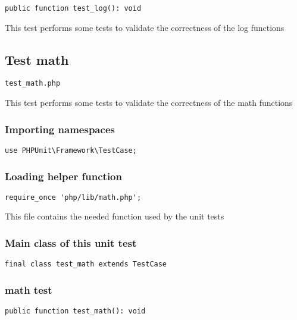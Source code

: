 \documentclass[a4paper]{article}
\begin{document}
\begin{lstlisting}
public function test_log(): void
\end{lstlisting}

This test performs some tests to validate the correctness
of the log functions

\hypertarget{toc258}{}
\subsection{Test math}

\begin{lstlisting}
test_math.php
\end{lstlisting}

This test performs some tests to validate the correctness
of the math functions

\hypertarget{toc259}{}
\subsubsection{Importing namespaces}

\begin{lstlisting}
use PHPUnit\Framework\TestCase;
\end{lstlisting}

\hypertarget{toc260}{}
\subsubsection{Loading helper function}

\begin{lstlisting}
require_once 'php/lib/math.php';
\end{lstlisting}

This file contains the needed function used by the unit tests

\hypertarget{toc261}{}
\subsubsection{Main class of this unit test}

\begin{lstlisting}
final class test_math extends TestCase
\end{lstlisting}

\hypertarget{toc262}{}
\subsubsection{math test}

\begin{lstlisting}
public function test_math(): void
\end{lstlisting}
\end{document}
